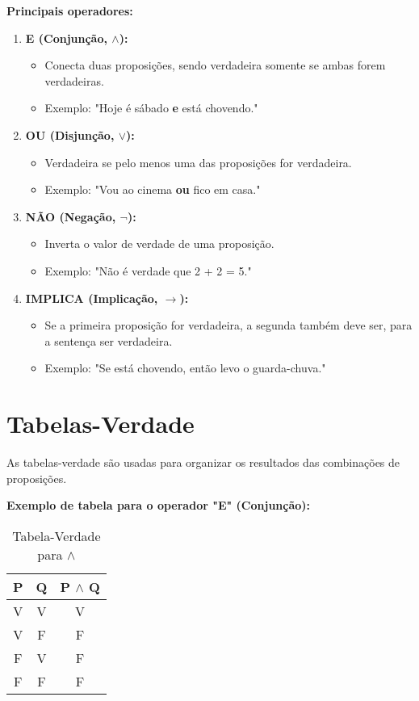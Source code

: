 \documentclass[a4paper,12pt]{book}
\begin{document}
\textbf{Principais operadores:}
\begin{enumerate}
    \item \textbf{E (Conjunção, \(\land\)):}
    \begin{itemize}
        \item Conecta duas proposições, sendo verdadeira somente se ambas forem verdadeiras.
        \item Exemplo: "Hoje é sábado \textbf{e} está chovendo."
    \end{itemize}
    \item \textbf{OU (Disjunção, \(\lor\)):}
    \begin{itemize}
        \item Verdadeira se pelo menos uma das proposições for verdadeira.
        \item Exemplo: "Vou ao cinema \textbf{ou} fico em casa."
    \end{itemize}
    \item \textbf{NÃO (Negação, \(\neg\)):}
    \begin{itemize}
        \item Inverta o valor de verdade de uma proposição.
        \item Exemplo: "Não é verdade que 2 + 2 = 5."
    \end{itemize}
    \item \textbf{IMPLICA (Implicação, \(\rightarrow\)):}
    \begin{itemize}
        \item Se a primeira proposição for verdadeira, a segunda também deve ser, para a sentença ser verdadeira.
        \item Exemplo: "Se está chovendo, então levo o guarda-chuva."
    \end{itemize}
\end{enumerate}

\newpage

\section{Tabelas-Verdade}
As tabelas-verdade são usadas para organizar os resultados das combinações de proposições.

\textbf{Exemplo de tabela para o operador "E" (Conjunção):}

\begin{table}[h!]
\centering
\begin{tabular}{|c|c|c|}
\hline
P & Q & P \(\land\) Q \\
\hline
V & V & V \\
V & F & F \\
F & V & F \\
F & F & F \\
\hline
\end{tabular}
\caption{Tabela-Verdade para \(\land\)}
\end{table}
\end{document}
